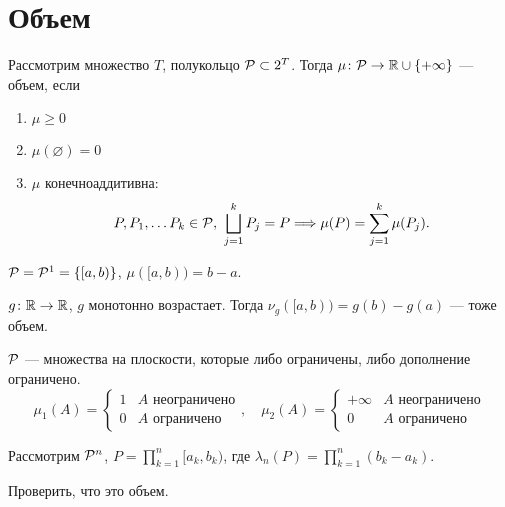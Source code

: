 \dotfill

{\vspace{20pt}  \fontsize{100}{60}\selectfont \faLinux  {}\vspace{20pt}}

\dotfill

\section{Объем}
\begin{defn}[Объем]
    Рассмотрим множество $ T$, полукольцо $ \P \subset 2^{T}$. Тогда $ \mu\colon \P \to \R \cup \{+\infty\}$ --- {\sf объем}, если
\begin{enumerate}[label=(\roman*),noitemsep]
    \item  $ \mu \ge 0$
	\item $ \mu(\varnothing) = 0$

	\item $ \mu$ конечноаддитивна:
		\[
			P, P_1, \ldots P_k \in \P, ~ \bigsqcup_{j=1}^{k}P_j = P \Longrightarrow \mu(P) = \sum_{j=1}^{k} \mu(P_j)
		.\] 
\end{enumerate} 
\end{defn}
\begin{ex}
	$ \P = \P^{1} = \{[a, b)\}$, $ \mu([a, b)) = b - a$.
\end{ex}
\begin{ex}
	$ g\colon \R \to \R$, $ g$ монотонно возрастает. Тогда  $ \nu_{g} ([a, b)) = g(b)-g(a)$ --- тоже объем.
\end{ex}
\begin{ex}
    $ \P$ --- множества на плоскости, которые либо ограничены, либо дополнение ограничено.
	\[
		\mu_1 (A) = 
		\begin{cases}
			1 & A  \text{ неограничено} \\
			0 & A  \text{ ограничено}
		\end{cases}
		, \quad
		\mu_2 (A) = 
		\begin{cases}
			+\infty & A  \text{ неограничено} \\
			0 & A  \text{ ограничено}
		\end{cases}
	\] 
\end{ex}
\begin{ex}
	Рассмотрим $ \P^{n}$, $ P = \prod\limits_{k=1}^{n} [a_k , b_k)$, где $ \lambda _{n}(P) = \prod_{k=1}^{n}(b_k - a_k)$.
	\begin{prac}
	    Проверить, что это объем.
	\end{prac}
\end{ex}

